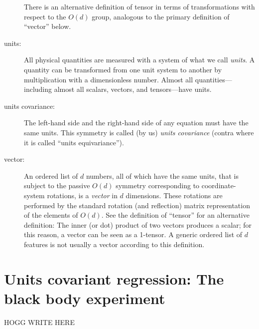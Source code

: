 \documentclass[]{article} %
\begin{document}
\begin{description}
  There is an alternative definition of tensor in terms of transformations with respect to the $O(d)$ group, analogous to the primary definition of ``vector'' below.
\item[units:]
  All physical quantities are measured with a system of what we call \emph{units}.
  A quantity can be transformed from one unit system to another by multiplication with a dimensionless number.
  Almost all quantities---including almost all scalars, vectors, and tensors---have units.
\item[units covariance:]
  The left-hand side and the right-hand side of any equation must have the same units.
  This symmetry is called (by us) \emph{units covariance} (contra \citealt{villar2022dimensionless} where it is called ``units equivariance'').
\item[vector:]
  An ordered list of $d$ numbers, all of which have the same units, that is subject to the passive $O(d)$ symmetry corresponding to coordinate-system rotations, is a \emph{vector} in $d$ dimensions.
  These rotations are performed by the standard rotation (and reflection) matrix representation of the elements of $O(d)$.
  See the definition of ``tensor'' for an alternative definition:
  The inner (or dot) product of two vectors produces a scalar; for this reason, a vector can be seen as a 1-tensor.
  A generic ordered list of $d$ features is not usually a vector according to this definition.
\end{description}

\section{Units covariant regression: The black body experiment}\label{app:dimensionless}
HOGG WRITE HERE
\end{document}
